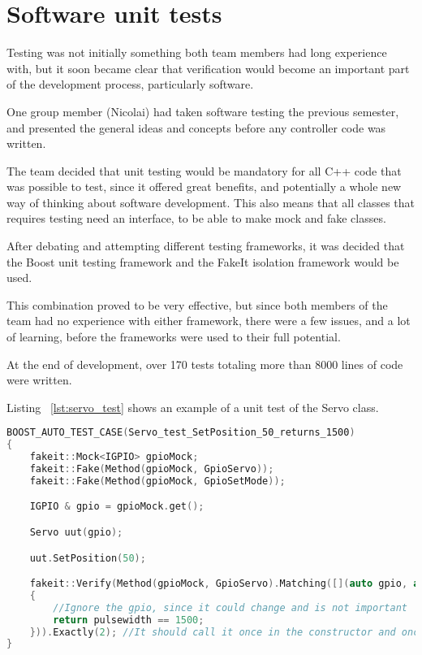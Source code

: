 \newpage
\section{Software unit tests}

Testing was not initially something both team members had long experience with, but it soon became clear that verification would become an important part of the development process, particularly software. 

One group member (Nicolai) had taken software testing the previous semester, and presented the general ideas and concepts before any controller code was written. 

The team decided that unit testing would be mandatory for all C++ code that was possible to test, since it offered great benefits, and potentially a whole new way of thinking about software development. This also means that all classes that requires testing need an interface, to be able to make mock and fake classes.

After debating and attempting different testing frameworks, it was decided that the Boost unit testing framework and the FakeIt isolation framework would be used. 

This combination proved to be very effective, but since both members of the team had no experience with either framework, there were a few issues, and a lot of learning, before the frameworks were used to their full potential.

At the end of development, over 170 tests totaling more than 8000 lines of code were written. 

Listing ~\ref{lst:servo_test} shows an example of a unit test of the Servo class.

\begin{lstlisting}[caption = {Servo test of SetPosition}, captionpos=b, label={lst:servo_test}, language=C++,firstnumber=1]
BOOST_AUTO_TEST_CASE(Servo_test_SetPosition_50_returns_1500)
{
	fakeit::Mock<IGPIO> gpioMock;
	fakeit::Fake(Method(gpioMock, GpioServo));
	fakeit::Fake(Method(gpioMock, GpioSetMode));

	IGPIO & gpio = gpioMock.get();

	Servo uut(gpio);

	uut.SetPosition(50);

	fakeit::Verify(Method(gpioMock, GpioServo).Matching([](auto gpio, auto pulsewidth)
	{
		//Ignore the gpio, since it could change and is not important
		return pulsewidth == 1500;
	})).Exactly(2); //It should call it once in the constructor and once again when we set it.
}
\end{lstlisting}


